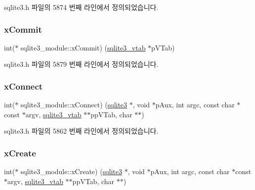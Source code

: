 sqlite3.\+h 파일의 5874 번째 라인에서 정의되었습니다.

\mbox{\label{structsqlite3__module_a1d9fa3ed3dd16165cfcda3a532a7a3fc}} 
\subsubsection{\texorpdfstring{x\+Commit}{xCommit}}
{\footnotesize\ttfamily int($\ast$ sqlite3\+\_\+module\+::x\+Commit) (\hyperlink{structsqlite3__vtab}{sqlite3\+\_\+vtab} $\ast$p\+V\+Tab)}



sqlite3.\+h 파일의 5879 번째 라인에서 정의되었습니다.

\mbox{\label{structsqlite3__module_a457fe622b5334195640e3e835c9923a8}} 
\subsubsection{\texorpdfstring{x\+Connect}{xConnect}}
{\footnotesize\ttfamily int($\ast$ sqlite3\+\_\+module\+::x\+Connect) (\hyperlink{sqlite3_8h_a0ef6f2646262c8a9b24368d8ac140f69}{sqlite3} $\ast$, void $\ast$p\+Aux, int argc, const char $\ast$const  $\ast$argv, \hyperlink{structsqlite3__vtab}{sqlite3\+\_\+vtab} $\ast$$\ast$pp\+V\+Tab, char $\ast$$\ast$)}



sqlite3.\+h 파일의 5862 번째 라인에서 정의되었습니다.

\mbox{\label{structsqlite3__module_a5934e38da1222cac999d01d372af293e}} 
\subsubsection{\texorpdfstring{x\+Create}{xCreate}}
{\footnotesize\ttfamily int($\ast$ sqlite3\+\_\+module\+::x\+Create) (\hyperlink{sqlite3_8h_a0ef6f2646262c8a9b24368d8ac140f69}{sqlite3} $\ast$, void $\ast$p\+Aux, int argc, const char $\ast$const  $\ast$argv, \hyperlink{structsqlite3__vtab}{sqlite3\+\_\+vtab} $\ast$$\ast$pp\+V\+Tab, char $\ast$$\ast$)}



